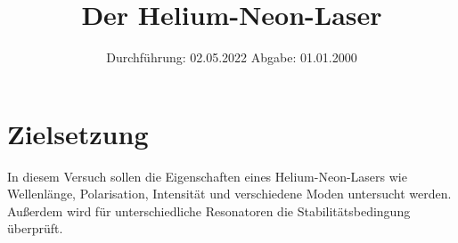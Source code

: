 
\usepackage{lipsum}
\def\TEM#1{$\text{TEM}_{#1}$}
\def\scipycurvefit{\href{https://docs.scipy.org/doc/scipy/reference/generated/scipy.optimize.curve_fit.html}{\texttt{scipy.optimize.curve\_fit}}}

\subject{V61}
\title{Der Helium-Neon-Laser}
\date{
    Durchführung: 02.05.2022
     \hspace{3em}
    Abgabe: 01.01.2000
}


\maketitle
\thispagestyle{empty}
\tableofcontents
\newpage

\section{Zielsetzung}

    In diesem Versuch sollen die Eigenschaften eines Helium-Neon-Lasers wie Wellenlänge, Polarisation, Intensität und verschiedene Moden untersucht werden.
    Außerdem wird für unterschiedliche Resonatoren die Stabilitätsbedingung überprüft.


\clearpage


\clearpage


\clearpage


\clearpage

\printbibliography


